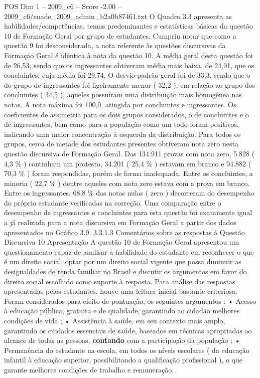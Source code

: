 \begin{textsample}{POS Dim 1 – 2009\_c6 – Score -2.00 – 2009\_c6/enade\_2009\_admin\_b2a0b87461.txt}
O Quadro 3.3 apresenta as habilidades/competências, temas predominantes e estatísticas básicas da questão 10 de Formação Geral por grupo de estudantes.
Cumpriu notar que como a questão 9 foi desconsiderada, a nota referente às questões discursivas da Formação Geral é idêntica à nota da questão 10.
A média geral desta questão foi de 26,53, sendo que os ingressantes obtiveram média mais baixa, de 24,01, que os concluintes, cuja média foi 29,74.
O desvio-padrão geral foi de 33,3, sendo que o do grupo de ingressantes foi ligeiramente menor ( 32,2 ), em relação ao grupo dos concluintes ( 34,5 ), aqueles possuíram uma distribuição mais homogênea nas notas.
A nota máxima foi 100,0, atingida por concluintes e ingressantes.
Os coeficientes de assimetria para os dois grupos considerados, o de concluintes e o de ingressantes, bem como para a população como um todo foram positivos, indicando uma maior concentração à esquerda da distribuição.
Para todos os grupos, cerca de metade dos estudantes presentes obtiveram nota zero nesta questão discursiva de Formação Geral.
Das 134.911 provas com nota zero, 5.828 ( 4,3 \% ) continham um protesto, 34.201 ( 25,4 \% ) estavam em branco e 94.882 ( 70,3 \% ) foram respondidas, porém de forma inadequada.
Entre os concluintes, a minoria ( 22,7 \% ) dentre aqueles com nota zero estava com a prova em branco.
Entre os ingressantes, 68,8 \% das notas nulas ( zero ) decorreram do desempenho do próprio estudante verificadas na correção.
Uma comparação entre o desempenho de ingressantes e concluintes para esta questão foi exatamente igual a já realizada para a nota discursiva em Formação Geral a partir dos dados apresentados no Gráfico 3.9. 3.3.1.3 Comentários sobre as respostas à Questão Discursiva 10 Apresentação A questão 10 de Formação Geral apresentou um questionamento capaz de analisar a habilidade do estudante em reconhecer o que é um direito social, optar por um direito social vigente que possa diminuir as desigualdades de renda familiar no Brasil e discutir os argumentos em favor do direito social escolhido como suporte à resposta.
Para análise das respostas apresentadas pelos estudantes, houve uma leitura inicial bastante criteriosa.
Foram considerados para efeito de pontuação, os seguintes argumentos : • Acesso à educação pública, gratuita e de qualidade, garantindo ao cidadão melhores condições de vida ; • Assistência à saúde, em seu contexto mais amplo, garantindo os cuidados essenciais de saúde, baseados em técnicas apropriadas ao alcance de todas as pessoas, \textbf{contando} com a participação da população ; • Permanência do estudante na escola, em todos os níveis escolares ( da educação infantil à educação superior, possibilitando a qualificação profissional ), o que garante melhores condições de trabalho e remuneração.

\end{textsample}
